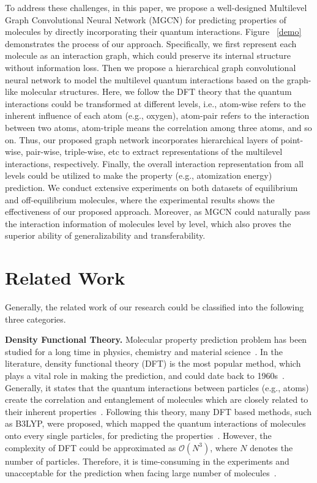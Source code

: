 \documentclass[letterpaper]{article} \usepackage{bm}
\begin{document}
To address these challenges, in this paper, we propose a well-designed Multilevel Graph Convolutional Neural Network (MGCN) for predicting properties of molecules by directly incorporating their quantum interactions. Figure ~\ref{demo} demonstrates the process of our approach. Specifically, we first represent each molecule as an interaction graph, which could preserve its internal structure without information loss. Then we propose a hierarchical graph convolutional neural network to model the multilevel quantum interactions based on the graph-like molecular structures. Here, we follow  the DFT theory that the quantum interactions could be transformed at different levels, i.e., atom-wise refers to the inherent influence of each atom (e.g., oxygen), atom-pair refers to the interaction between two atoms, atom-triple means the correlation among three atoms, and so on. Thus, our proposed graph network incorporates hierarchical layers of point-wise, pair-wise, triple-wise, etc to extract representations of the multilevel interactions, respectively. Finally, the overall interaction representation from all levels could be utilized to make the property (e.g., atomization energy) prediction. We conduct extensive experiments on both datasets of equilibrium and off-equilibrium molecules, where the experimental results shows the effectiveness of our proposed approach. Moreover, as MGCN could naturally pass the interaction information of molecules level by level, which also proves the superior ability of generalizability and transferability.


\section{Related Work}
Generally, the related work of our research could be classified into the following three categories.

\textbf{Density Functional Theory.}
Molecular property prediction problem has been studied for a long time in physics, chemistry and material science~\cite{wang2011application}. In the literature, density functional theory (DFT) is the most popular method, which plays a vital role in making the prediction, and could date back to 1960s~\cite{hohenberg1964inhomogeneous,kohn1965self,lawless2002information}. Generally, it states that the quantum interactions between particles (e.g., atoms) create the correlation and entanglement of molecules which are closely related to their inherent properties~\cite{thouless2014quantum}. Following this theory, many DFT based methods, such as B3LYP, were proposed, which mapped the quantum interactions of molecules onto every single particles, for predicting the properties~\cite{yanai2004new}. However, the complexity of DFT could be approximated as $\mathcal{O}(N^3)$, where $N$ denotes the number of particles. Therefore, it is time-consuming in the experiments and unacceptable for the prediction when facing large number of molecules~\cite{Gilmer2017NeuralMP}.
\end{document}
